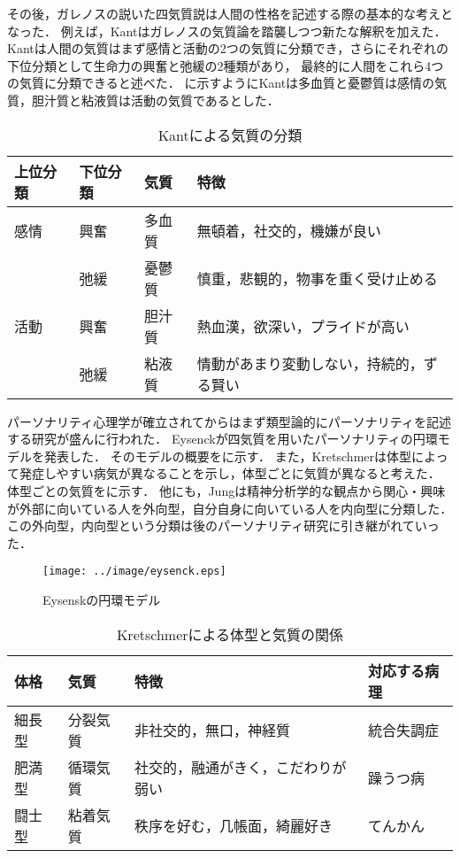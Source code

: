 その後，ガレノスの説いた四気質説は人間の性格を記述する際の基本的な考えとなった．
例えば，Kantはガレノスの気質論を踏襲しつつ新たな解釈を加えた\cite{kant}．
Kantは人間の気質はまず感情と活動の2つの気質に分類でき，さらにそれぞれの下位分類として生命力の興奮と弛緩の2種類があり，
最終的に人間をこれら4つの気質に分類できると述べた．
に示すようにKantは多血質と憂鬱質は感情の気質，胆汁質と粘液質は活動の気質であるとした．

\begin{table}[tb]
    \centering
    \caption{Kantによる気質の分類}
    \begin{tabular}{llll} \toprule
        上位分類 & 下位分類 & 気質 & 特徴 \\ \midrule
        感情 & 興奮 & 多血質 & 無頓着，社交的，機嫌が良い \\
        & 弛緩 & 憂鬱質 & 慎重，悲観的，物事を重く受け止める \\ \midrule
        活動 & 興奮 & 胆汁質 & 熱血漢，欲深い，プライドが高い \\ 
        & 弛緩 & 粘液質 & 情動があまり変動しない，持続的，ずる賢い \\ \bottomrule
    \end{tabular}
    \label{tab:kant}
\end{table}

パーソナリティ心理学が確立されてからはまず類型論的にパーソナリティを記述する研究が盛んに行われた．
Eysenck\cite{eysenck-1963}が四気質を用いたパーソナリティの円環モデルを発表した．
そのモデルの概要をに示す．
また，Kretschmer\cite{kretschmer}は体型によって発症しやすい病気が異なることを示し，体型ごとに気質が異なると考えた．
体型ごとの気質をに示す．
他にも，Jung\cite{jung}は精神分析学的な観点から関心・興味が外部に向いている人を外向型，自分自身に向いている人を内向型に分類した．
この外向型，内向型という分類は後のパーソナリティ研究に引き継がれていった．

\begin{figure}[tb]
    \centering
    \texttt{[image: ../image/eysenck.eps]}
    \caption[Eysenskの円環モデル]{Eysenskの円環モデル \protect \footnotemark}
    \label{fig:eysenck}
\end{figure}

\begin{table}[tb]
    \centering
    \caption[Kretschmerによる体型と気質の関係]{Kretschmerによる体型と気質の関係 \protect \footnotemark}
    \begin{tabular}{llll} \toprule
        体格 & 気質 & 特徴 & 対応する病理 \\ \midrule
        細長型 & 分裂気質 & 非社交的，無口，神経質 & 統合失調症 \\
        肥満型 & 循環気質 & 社交的，融通がきく，こだわりが弱い & 躁うつ病 \\
        闘士型 & 粘着気質 & 秩序を好む，几帳面，綺麗好き & てんかん \\ \bottomrule
    \end{tabular}
    \label{tab:kretschmer}
\end{table}

